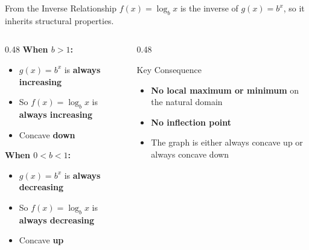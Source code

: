 \documentclass[aspectratio=169, 11pt]{beamer}
\begin{document}
\begin{frame}[t, plain]

  \begin{block}{From the Inverse Relationship}
    $f(x) = \log_b x$ is the inverse of $g(x) = b^x$, so it inherits structural properties.
  \end{block}

  \vspace{0.3cm}
  \begin{columns}[T]
    \begin{column}{0.48\textwidth}
      \textbf{When $b > 1$:}
      \begin{itemize}
        \setlength{\itemsep}{7pt}
        \item $g(x) = b^x$ is \textbf{always increasing}
        \item So $f(x) = \log_b x$ is \textbf{always increasing}
        \item Concave \textbf{down}
      \end{itemize}

      \vspace{0.2cm}
      \textbf{When $0 < b < 1$:}
      \begin{itemize}
        \setlength{\itemsep}{7pt}
        \item $g(x) = b^x$ is \textbf{always decreasing}
        \item So $f(x) = \log_b x$ is \textbf{always decreasing}
        \item Concave \textbf{up}
      \end{itemize}
    \end{column}
    \begin{column}{0.48\textwidth}
      \begin{block}{Key Consequence}
        \begin{itemize}
          \setlength{\itemsep}{8pt}
          \item \textbf{No local maximum or minimum} on the natural domain
          \item \textbf{No inflection point}
          \item The graph is either always concave up or always concave down
        \end{itemize}
      \end{block}
    \end{column}
  \end{columns}
\end{frame}
\end{document}
